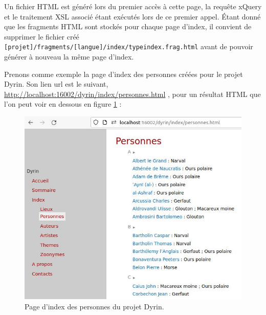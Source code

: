 \documentclass[a4paper,12pt,twoside]{book}
\begin{document}
Un fichier \acrshort{HTML} est généré lors du premier accès à cette page, la requête xQuery et le traitement \acrshort{XSL} associé étant exécutés lors de ce premier appel. Étant donné que les fragments \acrshort{HTML} sont stockés pour chaque page d'index, il convient de supprimer le fichier créé \texttt{[projet]/fragments/[langue]/index/typeindex.frag.html} avant de pouvoir générer à nouveau la même page d'index.


Prenons comme exemple la page d'index des personnes créées pour le projet Dyrin. Son lien url est le suivant, \url{http://localhost:16002/dyrin/index/personnes.html} , pour un résultat \acrshort{HTML} que l'on peut voir en dessous en figure \ref{pers} :

\begin{figure}[H]
    \centering
    \includegraphics[width=12cm]{img/partie_3/index_pers.JPG}
    \caption{Page d'index des personnes du projet Dyrin.}
    \label{pers}
\end{figure}
\end{document}
